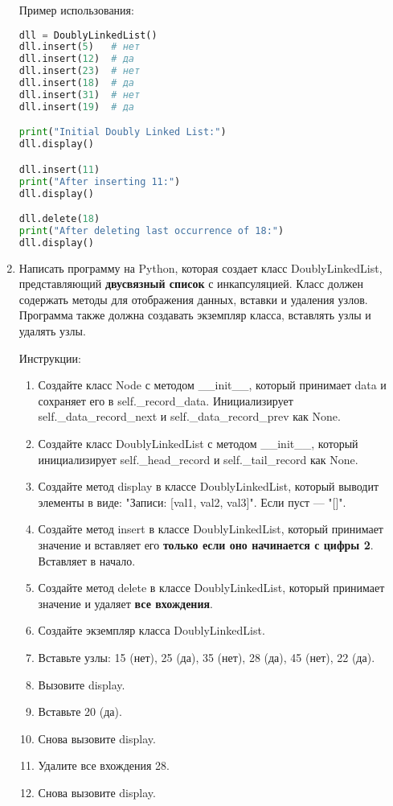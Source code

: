 \begin{enumerate}
Пример использования:
\begin{lstlisting}[language=Python]
dll = DoublyLinkedList()
dll.insert(5)   # нет
dll.insert(12)  # да
dll.insert(23)  # нет
dll.insert(18)  # да
dll.insert(31)  # нет
dll.insert(19)  # да

print("Initial Doubly Linked List:")
dll.display()

dll.insert(11)
print("After inserting 11:")
dll.display()

dll.delete(18)
print("After deleting last occurrence of 18:")
dll.display()
\end{lstlisting}

\item Написать программу на Python, которая создает класс DoublyLinkedList, представляющий \textbf{двусвязный список} с инкапсуляцией. Класс должен содержать методы для отображения данных, вставки и удаления узлов. Программа также должна создавать экземпляр класса, вставлять узлы и удалять узлы.

Инструкции:
\begin{enumerate}
    \item Создайте класс Node с методом \_\_init\_\_, который принимает data и сохраняет его в self.\_record\_data. Инициализирует self.\_data\_record\_next и self.\_data\_record\_prev как None.
    \item Создайте класс DoublyLinkedList с методом \_\_init\_\_, который инициализирует self.\_head\_record и self.\_tail\_record как None.
    \item Создайте метод display в классе DoublyLinkedList, который выводит элементы в виде: "Записи: [val1, val2, val3]". Если пуст — "[]".
    \item Создайте метод insert в классе DoublyLinkedList, который принимает значение и вставляет его \textbf{только если оно начинается с цифры 2}. Вставляет в начало.
    \item Создайте метод delete в классе DoublyLinkedList, который принимает значение и удаляет \textbf{все вхождения}.
    \item Создайте экземпляр класса DoublyLinkedList.
    \item Вставьте узлы: 15 (нет), 25 (да), 35 (нет), 28 (да), 45 (нет), 22 (да).
    \item Вызовите display.
    \item Вставьте 20 (да).
    \item Снова вызовите display.
    \item Удалите все вхождения 28.
    \item Снова вызовите display.
\end{enumerate}


\end{enumerate}

